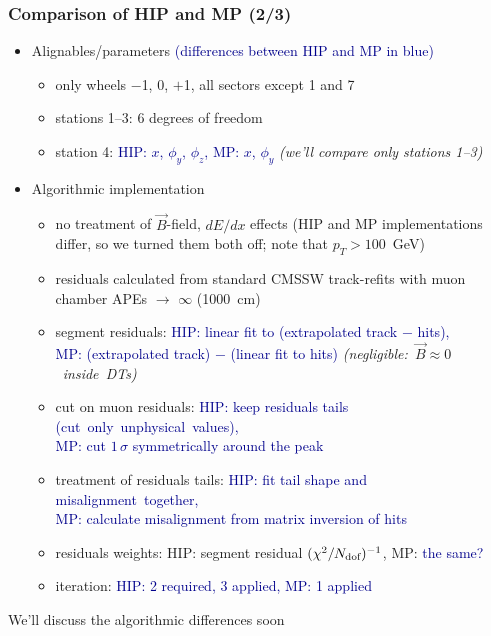 \documentclass[compress]{beamer}
\begin{document}
\begin{frame}
\frametitle{Comparison of HIP and MP (2/3)}
\begin{itemize}\setlength{\itemsep}{0.25 cm}
\item Alignables/parameters \textcolor{darkblue}{\scriptsize (differences between HIP and MP in blue)}
\begin{itemize}\setlength{\itemsep}{0.1 cm}\scriptsize
\item only wheels $-$1, 0, $+$1, all sectors except 1 and 7
\item stations 1--3: 6 degrees of freedom
\item station 4: \textcolor{darkblue}{HIP: $x$, $\phi_y$, $\phi_z$, MP: $x$, $\phi_y$} {\it (we'll compare only stations 1--3)}
\end{itemize}

\item Algorithmic implementation
\begin{itemize}\setlength{\itemsep}{0.1 cm}\scriptsize
\item no treatment of $\vec{B}$-field, $dE/dx$ effects (HIP and MP implementations differ, so we turned them both off; note that $p_T > 100$~GeV)
\item residuals calculated from standard CMSSW track-refits with muon chamber APEs $\to$ $\infty$ (1000~cm)
\item segment residuals: \textcolor{darkblue}{HIP: linear fit to (extrapolated track $-$ hits), \\ MP: (extrapolated track) $-$ (linear fit to hits)} \mbox{\it (negligible: $\vec{B} \approx 0$ inside DTs)\hspace{-1 cm}}
\item cut on muon residuals: \textcolor{darkblue}{HIP: keep residuals tails \mbox{(cut only unphysical values),\hspace{-1 cm}} \\ MP: cut $1 \, \sigma$ symmetrically around the peak}
\item treatment of residuals tails: \textcolor{darkblue}{HIP: fit tail shape and \mbox{misalignment together,\hspace{-1 cm}} \\ MP: calculate misalignment from matrix inversion of hits}
\item residuals weights: HIP: segment residual $(\chi^2/N_{\mbox{\scriptsize dof}})^{-1}$, MP: \textcolor{darkblue}{the same?}
\item iteration: \textcolor{darkblue}{HIP: 2 required, 3 applied, MP: 1 applied}
\end{itemize}
\end{itemize}

We'll discuss the algorithmic differences soon
\end{frame}
\end{document}
